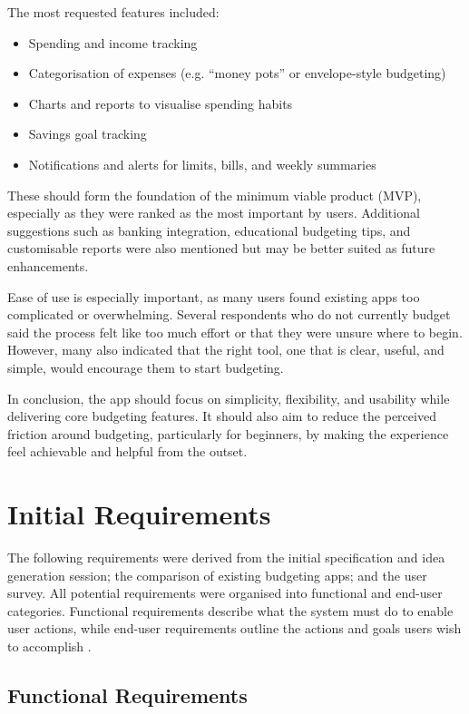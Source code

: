 \documentclass{l4proj}
\begin{document}
The most requested features included:

\begin{itemize}
    \item Spending and income tracking
    \item Categorisation of expenses (e.g. “money pots” or envelope-style budgeting)
    \item Charts and reports to visualise spending habits
    \item Savings goal tracking
    \item Notifications and alerts for limits, bills, and weekly summaries
\end{itemize}

These should form the foundation of the minimum viable product (MVP), especially as they were ranked as the most important by users. Additional suggestions such as banking integration, educational budgeting tips, and customisable reports were also mentioned but may be better suited as future enhancements.

Ease of use is especially important, as many users found existing apps too complicated or overwhelming. Several respondents who do not currently budget said the process felt like too much effort or that they were unsure where to begin. However, many also indicated that the right tool, one that is clear, useful, and simple, would encourage them to start budgeting.

In conclusion, the app should focus on simplicity, flexibility, and usability while delivering core budgeting features. It should also aim to reduce the perceived friction around budgeting, particularly for beginners, by making the experience feel achievable and helpful from the outset.

\section{Initial Requirements}

The following requirements were derived from the initial specification and idea generation session; the comparison of existing budgeting apps; and the user survey. All potential requirements were organised into functional and end-user categories. Functional requirements describe what the system must do to enable user actions, while end-user requirements outline the actions and goals users wish to accomplish \citep{geeksforgeeks_classification_2024}.

\subsection{Functional Requirements}
\end{document}
